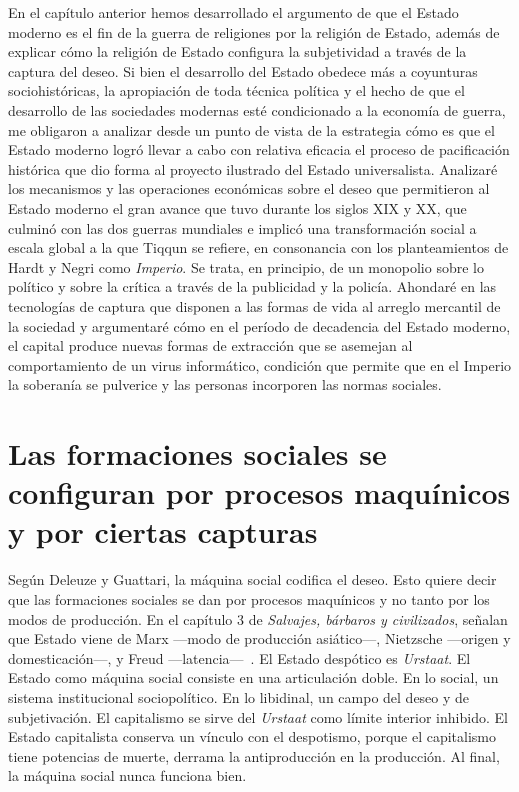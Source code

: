 En el capítulo anterior hemos desarrollado el argumento de que el Estado moderno es el fin de la guerra de religiones por la religión de Estado, además de explicar cómo la religión de Estado configura la subjetividad a través de la captura del deseo. Si bien el desarrollo del Estado obedece más a coyunturas sociohistóricas, la apropiación de toda técnica política y el hecho de que el desarrollo de las sociedades modernas esté condicionado a la economía de guerra, me obligaron a analizar desde un punto de vista de la estrategia cómo es que el Estado moderno logró llevar a cabo con relativa eficacia el proceso de pacificación histórica que dio forma al proyecto ilustrado del Estado universalista. Analizaré los mecanismos y las operaciones económicas sobre el deseo que permitieron al Estado moderno el gran avance que tuvo durante los siglos XIX y XX, que culminó con las dos guerras mundiales e implicó una transformación social a escala global a la que Tiqqun se refiere, en consonancia con los planteamientos de Hardt y Negri \autocite{hardtImperio2005} como \emph{Imperio}. Se trata, en principio, de un monopolio sobre lo político y sobre la crítica a través de la publicidad y la policía. Ahondaré en las tecnologías de captura que disponen a las formas de vida al arreglo mercantil de la sociedad y argumentaré cómo en el período de decadencia del Estado moderno, el capital produce nuevas formas de extracción que se asemejan al comportamiento de un virus informático, condición que permite que en el Imperio la soberanía se pulverice y las personas incorporen las normas sociales.

\section{Las formaciones sociales se configuran por procesos maquínicos y por ciertas capturas}
\label{sec:las-formaciones-sociales}

Según Deleuze y Guattari, la máquina social codifica el deseo. Esto quiere decir que las formaciones sociales se dan por procesos maquínicos y no tanto por los modos de producción. En el capítulo 3 de \emph{Salvajes, bárbaros y civilizados}, señalan que Estado viene de Marx ---modo de producción asiático---, Nietzsche ---origen y domesticación---, y Freud ---latencia---~\autocite{deleuzeAntiedipoCapitalismoEsquizofrenia2017}. El Estado despótico es \emph{Urstaat}. El Estado como máquina social consiste en una articulación doble. En lo social, un sistema institucional sociopolítico. En lo libidinal, un campo del deseo y de subjetivación. El capitalismo se sirve del \emph{Urstaat} como límite interior inhibido. El Estado capitalista conserva un vínculo con el despotismo, porque el capitalismo tiene potencias de muerte, derrama la antiproducción en la producción. Al final, la máquina social nunca funciona bien.

